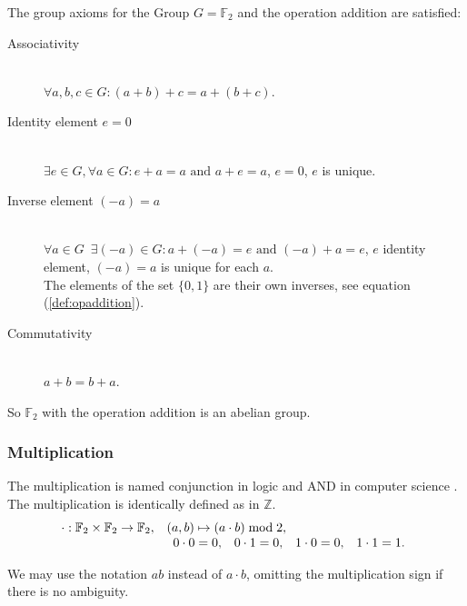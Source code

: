\documentclass[a4paper]{article}
\newcommand{\BF}{\mathbb{F}}
\newcommand{\BZ}{\mathbb{Z}}
\newcommand{\0}{\mathbf{0}}
\newcommand{\1}{\mathbf{1}}
\begin{document}
The group axioms \cite[ch. 2.2.8]{Fischer2020} for the Group $G = \BF_2$ and the operation addition are satisfied:
\begin{description}
\item[Associativity] \ \\
$\forall a, b, c \in G: (a + b) + c = a + (b + c)$.
\item[Identity element $e = 0$] \ \\
$\exists e \in G, \forall a \in G: e + a = a \text{ and } a + e = a$, $e = 0$, $e$ is unique.
\item[Inverse element $(-a) = a$] \ \\
$\forall a \in G \enspace \exists (-a) \in G : a + (-a) = e \text{ and } (-a) + a = e$, $e$ identity element, $(-a) = a$ is unique for each $a$. \\
The elements of the set $\{0, 1\}$ are their own inverses, see equation (\ref{def:opaddition}).
\item[Commutativity] \ \\
$a + b = b + a$.
\end{description}
So $\BF_2$ with the operation addition is an abelian group.

\subsubsection{Multiplication}
The multiplication is named conjunction in logic and
AND in computer science
\cite{knuth:taocp_v4_f0, wikipedia_en_2025_LogicalConjunction}.
The multiplication is identically defined as in $\BZ$.
\begin{equation}
\begin{array}{ll}
\cdot : \BF_2 \times \BF_2 \rightarrow \BF_2, & (a,b) \mapsto (a \cdot b) \bmod 2, \\
& \begin{array}{l l l l}
0 \cdot 0 = 0, & 0 \cdot 1 = 0, & 1 \cdot 0 = 0, & 1 \cdot 1 = 1. \\
\end{array}
\end{array}
\label{def:opmultiplication}
\end{equation}

We may use the notation $ab$ instead of $a \cdot b$, omitting the multiplication sign if there is no ambiguity.
\end{document}
